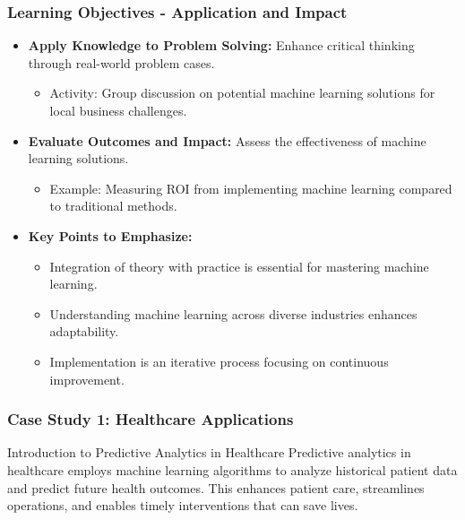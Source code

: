 \documentclass{beamer}
\begin{document}
\begin{frame}[fragile]
    \frametitle{Learning Objectives - Application and Impact}
    \begin{itemize}
        \item \textbf{Apply Knowledge to Problem Solving:} 
        Enhance critical thinking through real-world problem cases.
        \begin{itemize}
            \item Activity: Group discussion on potential machine learning solutions for local business challenges.
        \end{itemize}
        
        \item \textbf{Evaluate Outcomes and Impact:} 
        Assess the effectiveness of machine learning solutions.
        \begin{itemize}
            \item Example: Measuring ROI from implementing machine learning compared to traditional methods.
        \end{itemize}
        
        \item \textbf{Key Points to Emphasize:}
        \begin{itemize}
            \item Integration of theory with practice is essential for mastering machine learning.
            \item Understanding machine learning across diverse industries enhances adaptability.
            \item Implementation is an iterative process focusing on continuous improvement.
        \end{itemize}
    \end{itemize}
\end{frame}

\begin{frame}[fragile]
    \frametitle{Case Study 1: Healthcare Applications}
    \begin{block}{Introduction to Predictive Analytics in Healthcare}
        Predictive analytics in healthcare employs machine learning algorithms to analyze historical patient data and predict future health outcomes. This enhances patient care, streamlines operations, and enables timely interventions that can save lives.
    \end{block}
\end{frame}
\end{document}
